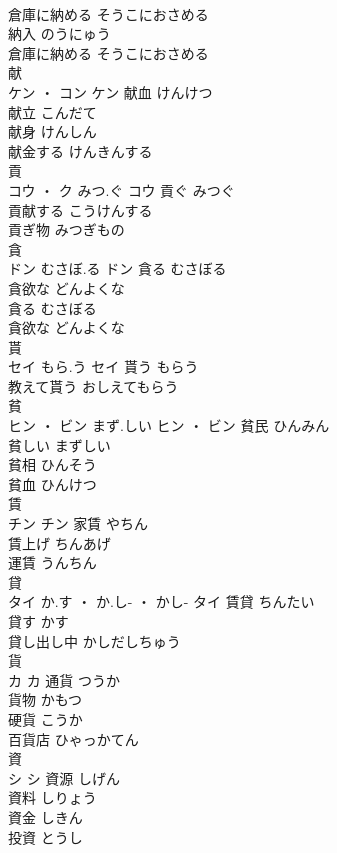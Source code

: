 \documentclass[8pt]{extreport}
\begin{document}
\begin{CJK}{UTF8}{min}
\\	倉庫に納める	そうこにおさめる	
\\	納入	のうにゅう	
\\	倉庫に納める	そうこにおさめる	
\\	献	
\\	ケン ・ コン		ケン	献血	けんけつ	
\\	献立	こんだて	
\\	献身	けんしん	
\\	献金する	けんきんする	
\\	貢	
\\	コウ ・ ク	みつ.ぐ	コウ	貢ぐ	みつぐ	
\\	貢献する	こうけんする	
\\	貢ぎ物	みつぎもの	
\\	貪	
\\	ドン	むさぼ.る	ドン	貪る	むさぼる	
\\	貪欲な	どんよくな	
\\	貪る	むさぼる	
\\	貪欲な	どんよくな	
\\	貰	
\\	セイ	もら.う	セイ	貰う	もらう	
\\	教えて貰う	おしえてもらう	
\\	貧	
\\	ヒン ・ ビン	まず.しい	ヒン ・ ビン	貧民	ひんみん	
\\	貧しい	まずしい	
\\	貧相	ひんそう	
\\	貧血	ひんけつ	
\\	賃	
\\	チン		チン	家賃	やちん	
\\	賃上げ	ちんあげ	
\\	運賃	うんちん	
\\	貸	
\\	タイ	か.す ・ か.し- ・ かし-	タイ	賃貸	ちんたい	
\\	貸す	かす	
\\	貸し出し中	かしだしちゅう	
\\	貨	
\\	カ		カ	通貨	つうか	
\\	貨物	かもつ	
\\	硬貨	こうか	
\\	百貨店	ひゃっかてん	
\\	資	
\\	シ		シ	資源	しげん	
\\	資料	しりょう	
\\	資金	しきん	
\\	投資	とうし	

\end{CJK}
\end{document}
